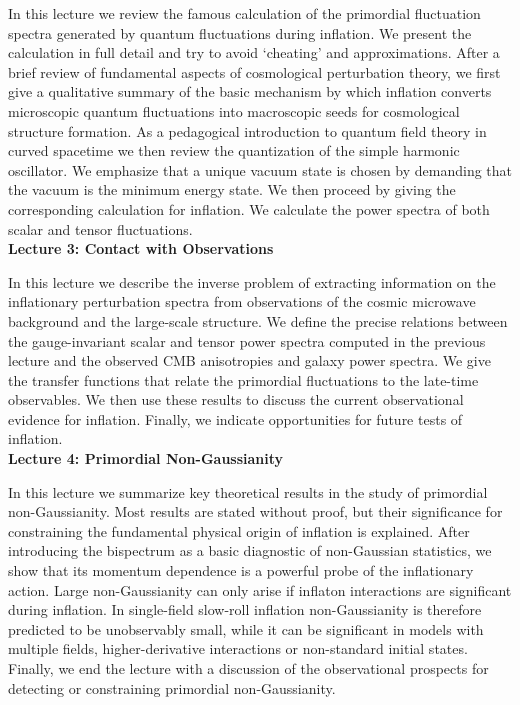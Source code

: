 \documentclass[12pt,letterpaper,rotate]{article}
\begin{document}
{In this lecture we review the famous calculation of the primordial fluctuation spectra generated by quantum fluctuations during inflation.
We present the calculation in full detail and try to avoid `cheating' and approximations.
After a brief review of fundamental aspects of cosmological perturbation theory, we first give a qualitative summary of the basic mechanism by which inflation converts microscopic quantum fluctuations into macroscopic seeds for cosmological  structure formation.
As a pedagogical introduction to quantum field theory in curved spacetime we then review the quantization of the simple harmonic oscillator. We emphasize that a unique vacuum state is chosen by demanding that the vacuum is the minimum energy state.
We then proceed by giving the corresponding calculation for inflation.
We calculate the power spectra of both scalar and tensor fluctuations.\\


{\bf Lecture 3: Contact with Observations}

In this lecture we describe the inverse problem of extracting information on the inflationary perturbation spectra from observations of the cosmic microwave background and the large-scale structure.
We define the precise relations between the gauge-invariant scalar and tensor power spectra computed in the previous lecture and the observed CMB anisotropies and galaxy power spectra.
We give the transfer functions that relate the primordial fluctuations to the late-time observables.
We then use these results to discuss the current observational evidence for inflation.
Finally, we indicate opportunities for future tests of inflation.\\

{\bf Lecture 4: Primordial Non-Gaussianity}

In this lecture we summarize key theoretical results in the study of primordial non-Gaussianity.
Most results are stated without proof, but their significance for constraining the fundamental physical origin of inflation is explained.
After introducing the bispectrum as a basic diagnostic of non-Gaussian statistics, we show that its momentum dependence is a powerful probe of the inflationary action.
Large non-Gaussianity can only arise if inflaton interactions are significant during inflation. In single-field slow-roll inflation non-Gaussianity is therefore predicted to be unobservably small, while it can be significant in models with multiple fields, higher-derivative interactions or non-standard initial states.
Finally, we end the lecture with a discussion of the observational prospects for detecting or constraining primordial non-Gaussianity.
\\



}
\end{document}

